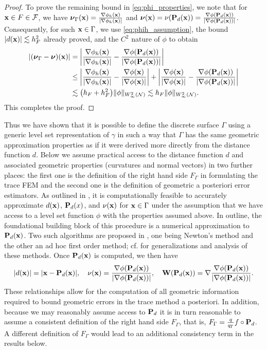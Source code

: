 \begin{proof}
  
To prove the remaining bound in \eqref{eq:phi_properties}, we note that for ${\bf x} \in F \in \mathcal{F}$, we have ${\boldsymbol \nu}_\Gamma({\bf x})= \frac{ \nabla \phi_h({\bf x})}{|\nabla \phi_h({\bf x})|}$ and ${\boldsymbol \nu}({\bf x}) = \nu({\bf P}_d({\bf x})) = \frac{\nabla \phi({\bf P}_d({\bf x}))}{|\nabla \phi ({\bf P}_d({\bf x}))|}$. Consequently, for such ${\bf x} \in \Gamma$, we use \eqref{eq:phih_assumption}, the bound $|d({\bf x})| \lesssim h_F^2$ already proved, and the $C^2$ nature of $\phi$ to obtain
\begin{align*}
\begin{aligned}
\left |({\boldsymbol \nu}_\Gamma-{\boldsymbol \nu})({\bf x}) \right| &= \left |\frac{ \nabla \phi_h({\bf x})}{| \nabla \phi_h({\bf x})|}-\frac{\nabla \phi({\bf P}_d({\bf x}))}{|\nabla \phi ({\bf P}_d({\bf x}))|} \right| 
\\ & \le \left |\frac{ \nabla \phi_h({\bf x})}{|\nabla \phi_h({\bf x})|}-\frac{ \nabla \phi({\bf x})}{|\nabla \phi({\bf x})|} \right | + \left | \frac{ \nabla \phi({\bf x})}{|\nabla \phi({\bf x})|}-\frac{\nabla \phi({\bf P}_d({\bf x}))}{|\nabla \phi ({\bf P}_d({\bf x}))|}\right | \\ & \lesssim \big(h_F + h_F^2\big) \|\phi\|_{W^2_\infty(\mathcal{N})} \lesssim h_F \|\phi\|_{W^2_\infty(\mathcal{N})}.
\end{aligned}
\end{align*}  
This completes the proof.
\end{proof}
 
Thus we have shown that it is possible to define the discrete surface $\Gamma$ using a generic level set representation of $\gamma$ in such a way that $\Gamma$ has the same geometric approximation properties as if it were derived more directly from the distance function $d$.  Below we assume practical access to the distance function $d$ and associated geometric properties (curvatures and normal vectors) in two further places: the first one is the definition of the right hand side $F_\Gamma$ in formulating the trace FEM and the second one is the definition of geometric a posteriori error estimators.  As outlined in \cite{DemlowDziuk:07}, it is computationally feasible to accurately approximate $d({\bf x})$, ${\bf P}_d(x)$, and $\nu({\bf x})$ for ${\bf x} \in \Gamma$ under the assumption that we have access to a level set function $\phi$ with the properties assumed above.  In outline, the foundational building block of this procedure is a numerical approximation to ${\bf P}_d({\bf x})$.  Two such algorithms are proposed in \cite{DemlowDziuk:07}, one being Newton's method and the other an ad hoc first order method; cf. \cite{Gr17} for generalizations and analysis of these methods.  Once ${\bf P}_d({\bf x})$ is computed, we then have
%
\[
|d({\bf x})| = |{\bf x} - {\bf P}_d({\bf x})|,
\quad
\nu({\bf x})= \frac{\nabla \phi({\bf P}_d({\bf x}))}{|\nabla \phi({\bf P}_d({\bf x}))|},
\quad{\bf W}({\bf P}_d({\bf x}))= \nabla \frac{\nabla \phi({\bf P}_d({\bf x}))}{|\nabla \phi({\bf P}_d({\bf x}))|}.
\]
%
These relationships allow for the computation of all geometric information required to bound geometric errors in the trace method a posteriori.  In addition, because we may reasonably assume access to ${\bf P}_d$ it is in turn reasonable to assume a consistent definition of the right hand side $F_\Gamma$, that is, $F_\Gamma = \frac{q}{q_\Gamma} f \circ {\bf P}_d$.  A different definition of $F_\Gamma$ would lead to an additional consistency term in the results below.
  
